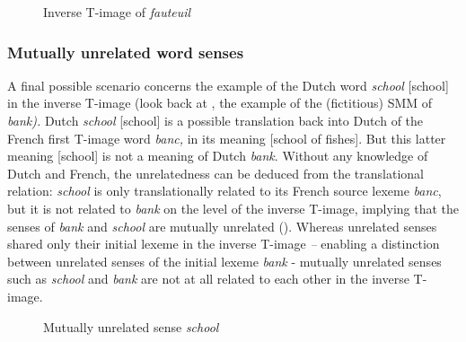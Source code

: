 \begin{figure}
\caption{\label{fig:3:13}  Inverse T-image of \textit{fauteuil}}
\end{figure}

\subsubsection{Mutually unrelated word senses}
\label{sec:3.4.3.3}
A final possible scenario concerns the example of the Dutch word \textit{school} [school] in the inverse T-image (look back at , the example of the (fictitious) SMM of \textit{bank).} Dutch \textit{school} [school] is a possible translation back into Dutch of the French first T-image word \textit{banc,} in its meaning [school of fishes]. But this latter meaning [school] is not a meaning of Dutch \textit{bank}. Without any knowledge of Dutch and French, the unrelatedness can be deduced from the translational relation: \textit{school} is only translationally related to its French source lexeme \textit{banc}, but it is not related to \textit{bank} on the level of the inverse T-image, implying that the senses of \textit{bank} and \textit{school} are mutually unrelated (). Whereas unrelated senses shared only their initial lexeme in the inverse T-image \textit{–} enabling a distinction between unrelated senses of the initial lexeme \textit{bank} - mutually unrelated senses such as \textit{school} and \textit{bank} are not at all related to each other in the inverse T-image.

\begin{figure}
\caption{\label{fig:3:14}  Mutually unrelated sense \textit{school}}
\end{figure}

